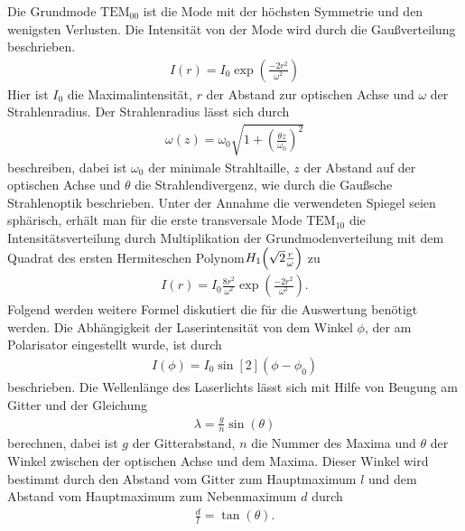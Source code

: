 Die Grundmode $\mathrm{TEM}_{00}$ ist die Mode mit der höchsten Symmetrie und den wenigsten Verlusten. Die Intensität von der Mode wird durch die Gaußverteilung beschrieben.
\begin{align}
I(r)=I_0\exp\left(\frac{-2r^2}{\omega^2}\right)
\label{eq:tem00}
\end{align}
Hier ist $I_0$ die Maximalintensität, $r$ der Abstand zur optischen Achse und $\omega$ der Strahlenradius. Der Strahlenradius lässt sich durch
\begin{align}
\omega(z)=\omega_0 \sqrt{1+\left(\frac{\theta z}{\omega_0}\right)^2}
\end{align}
beschreiben, dabei ist $\omega_0$ der minimale Strahltaille, $z$ der Abstand auf der optischen Achse und $\theta$ die Strahlendivergenz, wie durch die Gaußsche 
Strahlenoptik beschrieben.
Unter der Annahme die verwendeten Spiegel seien sphärisch, erhält man für die erste transversale Mode $\mathrm{TEM}_{10}$ 
die Intensitätsverteilung durch Multiplikation der Grundmodenverteilung mit dem Quadrat des ersten Hermiteschen Polynom\footnotemark $H_1\qty(\sqrt{2}\frac{r}{\omega})$\cite{Demtroeder07}
zu
\begin{align}
I(r)=I_0\frac{8r^2}{\omega^2}\exp\left(\frac{-2r^2}{\omega^2}\right).
\label{eq:tem10}
\end{align}
Folgend werden weitere Formel diskutiert die für die Auswertung benötigt werden.
Die Abhängigkeit der Laserintensität von dem Winkel $\phi$, der am Polarisator eingestellt wurde, ist durch
\begin{align}
I(\phi)=I_0\sin[2](\phi - \phi_0)
\label{eq:polarisation}
\end{align}
beschrieben. 
Die Wellenlänge des Laserlichts lässt sich mit Hilfe von Beugung am Gitter und der Gleichung
\begin{align}
\lambda=\frac{g}{n}\sin\left(  \theta \right)
\label{eq:gitter}
\end{align}
berechnen, dabei ist $g$ der Gitterabstand, $n$ die Nummer des Maxima und $\theta$ der Winkel zwischen der optischen Achse und dem Maxima. Dieser Winkel wird bestimmt durch den Abstand vom Gitter zum Hauptmaximum $l$ und dem Abstand vom  Hauptmaximum zum Nebenmaximum $d$ durch
\begin{align}
\frac{d}{l}=\tan\left( \theta \right).
\label{eq:gitter_winkel}
\end{align}




